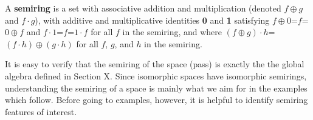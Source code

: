 \documentclass[11pt]{article}
\begin{document}
\begin{definition}
A {\bf semiring} is a set with associative addition and multiplication (denoted $f\oplus g$ and $f\cdot g$), with additive and 
multiplicative identities {\bf 0} and {\bf 1} satisfying $f\oplus 0$=$f$=$0\oplus f$ and $f\cdot 1$=$f$=$1\cdot f$ for all $f$ in the semiring, and where 
$(f\oplus g)\cdot h$=$(f\cdot h)\oplus (g\cdot h)$ for all $f$, $g$, and $h$ in the semiring.   
\end{definition} 

It is easy to verify that the semiring of the space (pass) is exactly the the global algebra defined in Section X.  Since isomorphic spaces have 
isomorphic semirings, understanding the semiring of a space is mainly what we aim for in the examples which follow.  Before going to examples, however, it is helpful 
to identify semiring features of interest. 
\end{document}
